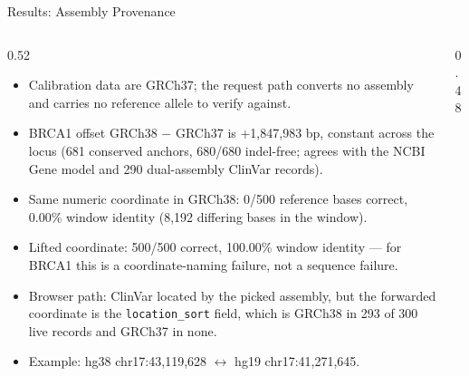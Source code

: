 \documentclass[aspectratio=169,10pt]{beamer}
\begin{document}
\begin{frame}{Results: Assembly Provenance}
\begin{columns}[T]
\begin{column}{0.52\textwidth}
\begin{itemize}\small
\item Calibration data are GRCh37; the request path converts no assembly and carries no reference allele to verify against.
\item BRCA1 offset GRCh38 $-$ GRCh37 is +1,847,983 bp, constant across the locus (681 conserved anchors, 680/680 indel-free; agrees with the NCBI Gene model and 290 dual-assembly ClinVar records).
\item Same numeric coordinate in GRCh38: 0/500 reference bases correct, 0.00\% window identity (8,192 differing bases in the window).
\item Lifted coordinate: 500/500 correct, 100.00\% window identity --- for BRCA1 this is a coordinate-naming failure, not a sequence failure.
\item Browser path: ClinVar located by the picked assembly, but the forwarded coordinate is the \texttt{location\_sort} field, which is GRCh38 in 293 of 300 live records and GRCh37 in none.
\item Example: hg38 chr17:43,119,628 $\leftrightarrow$ hg19 chr17:41,271,645.
\end{itemize}
\end{column}
\begin{column}{0.48\textwidth}
\centering
{}
\end{column}
\end{columns}
\end{frame}
\end{document}

